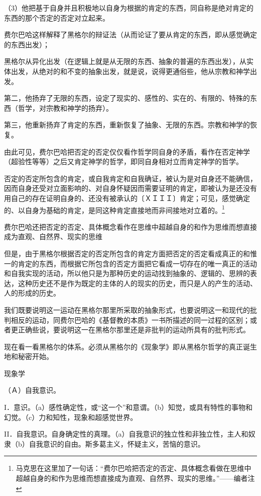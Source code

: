 \documentclass[a4paper,twoside,12pt,AutoFakeBold]{ctexart}
\begin{document}
（3）他把基于自身并且积极地以自身为根据的肯定的东西，同自称是绝对肯定的东西的那个否定的否定对立起来。

费尔巴哈这样解释了黑格尔的辩证法（从而论证了要从肯定的东西，即从感觉确定的东西出发）；

黑格尔从异化出发（在逻辑上就是从无限的东西、抽象的普遍的东西出发），从实体出发，从绝对的和不变的抽象出发，就是说，说得更通俗些，他从宗教和神学出发。

第二，他扬弃了无限的东西，设定了现实的、感性的、实在的、有限的、特殊的东西（哲学，对宗教和神学的扬弃）。

第三，他重新扬弃了肯定的东西，重新恢复了抽象、无限的东西。宗教和神学的恢复。

由此可见，费尔巴哈把否定的否定仅仅看作哲学同自身的矛盾，看作在否定神学（超验性等等）之后又肯定神学的哲学，即同自身相对立而肯定神学的哲学。

否定的否定所包含的肯定，或自我肯定和自我确证，被认为是对自身还不能确信，因而自身还受对立面影响的、对自身怀疑因而需要证明的肯定，即被认为是还没有用自己的存在证明自身的、还没有被承认的〔ＸＩＩＩ〕肯定；可见，感觉确定的、以自身为基础的肯定，是同这种肯定直接地而非间接地对立着的。\footnote{马克思在这里加了一句话：“费尔巴哈把否定的否定、具体概念看做在思维中超越自身的和作为思维而想直接成为直观、自然界、现实的思维。”——编者注}

费尔巴哈还把否定的否定、具体概念看作在思维中超越自身的和作为思维而想直接成为直观、自然界、现实的思维

但是，由于黑格尔根据否定的否定所包含的肯定方面把否定的否定看成真正的和惟一的肯定的东西，而根据它所包含的否定方面把它看成一切存在的唯一真正的活动和自我实现的活动，所以他只是为那种历史的运动找到抽象的、逻辑的、思辨的表达，这种历史还不是作为既定的主体的人的现实的历史，而只是人的产生的活动、人的形成的历史。

我们既要说明这一运动在黑格尔那里所采取的抽象形式，也要说明这一和现代的批判相反的运动，同费尔巴哈的《基督教的本质》一书所描述的同一过程的区别；或者更正确些说，要说明这一在黑格尔那里还是非批判的运动所具有的批判形式。

现在看一看黑格尔的体系。必须从黑格尔的《现象学》即从黑格尔哲学的真正诞生地和秘密开始。

现象学

（Ａ）自我意识。

I．意识。（a）感性确定性，或“这一个”和意谓。（b）知觉，或具有特性的事物和幻觉。（c）力和知性，现象和超感觉世界。

II．自我意识。自身确定性的真理。（a）自我意识的独立性和非独立性，主人和奴隶（b）自我意识的自由。斯多葛主义，怀疑主义，苦恼的意识。
\end{document}
